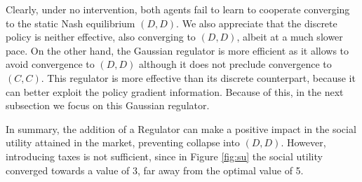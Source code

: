  Clearly, under no intervention, both agents fail to learn to cooperate
converging to the static 
Nash equilibrium $(D,D)$. 
We also appreciate that the discrete policy is neither 
effective, also converging to $(D,D)$, albeit at a much slower pace.
On the other hand, the Gaussian regulator is 
 more efficient as it allows to avoid convergence to $(D,D)$
although it does not preclude convergence to $(C,C)$.
This regulator is more effective than its discrete counterpart,
because it can better exploit 
the policy gradient information. Because of this, 
in the next subsection we focus on this Gaussian regulator.

In summary, the addition of a Regulator can make a positive impact in the social utility attained in the market, preventing collapse into $(D, D)$. However, introducing taxes is not sufficient, since in Figure \ref{fig:su} the social utility converged towards a value of 3, far away from the optimal value of 5.

